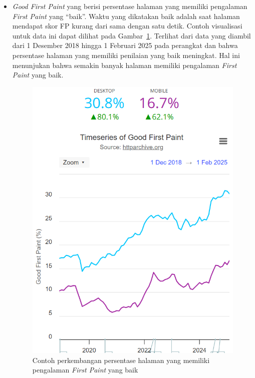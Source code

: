 \begin{itemize}
    \item \textit{Good First Paint} yang berisi persentase halaman \web yang memiliki pengalaman \textit{First Paint} yang ``baik''. Waktu yang dikatakan baik adalah saat halaman \web mendapat skor FP kurang dari sama dengan satu detik. Contoh visualisasi untuk data ini dapat dilihat pada Gambar~\ref{fig:firstpaint}. Terlihat dari data yang diambil dari 1 Desember 2018 hingga 1 Februari 2025 pada perangkat \desktop dan \mobile bahwa persentase halaman yang memiliki penilaian yang baik meningkat. Hal ini menunjukan bahwa semakin banyak halaman \web memiliki pengalaman \textit{First Paint} yang baik. 
    \begin{figure}[H]
        \centering
        \includegraphics[width=0.4\linewidth]{Gambar/Contoh Good Paint.png}
        \caption{Contoh perkembangan persentase halaman yang memiliki pengalaman \textit{First Paint} yang baik}
        \label{fig:firstpaint}
    \end{figure}


\end{itemize}
